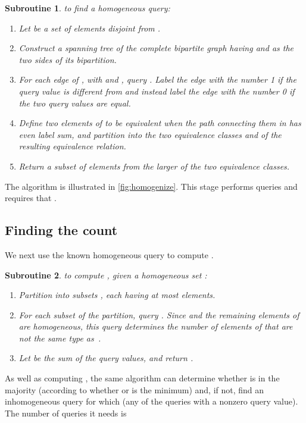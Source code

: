 \documentclass[11pt]{llncs}
\newtheorem{subroutine}{Subroutine}
\begin{document}
\begin{subroutine} to find a homogeneous query:
\label{sbr:homogeneous}
\begin{enumerate}
\item Let  be a set of  elements disjoint from .
\item Construct a spanning tree  of the complete bipartite graph  having  and  as the two sides of its bipartition.
\item For each edge  of , with  and , query . Label the edge with the number 1 if the query value is different from  and instead label the edge with the number 0 if the two query values are equal.
\item Define two elements of  to be equivalent when the path connecting them in  has even label sum, and partition  into the two equivalence classes  and  of the resulting equivalence relation.
\item Return a subset of  elements from the larger of the two equivalence classes.\end{enumerate}
\end{subroutine}

The algorithm is illustrated in \autoref{fig:homogenize}.
This stage performs  queries and requires that .

\subsection{Finding the count}

We next use the known homogeneous query  to compute .

\begin{subroutine} to compute , given a homogeneous set :
\begin{enumerate}
\item Partition  into  subsets , each having at most  elements.
\item For each subset  of the partition, query . Since  and the remaining elements of  are homogeneous, this query determines the number of elements of  that are not the same type as~.
\item Let  be the sum of the query values, and return .
\end{enumerate}
\end{subroutine}

As well as computing , the same algorithm can determine whether  is in the majority (according to whether  or  is the minimum) and, if not, find an inhomogeneous query  for which  (any of the queries with a nonzero query value). The number of queries it needs is
\end{document}
